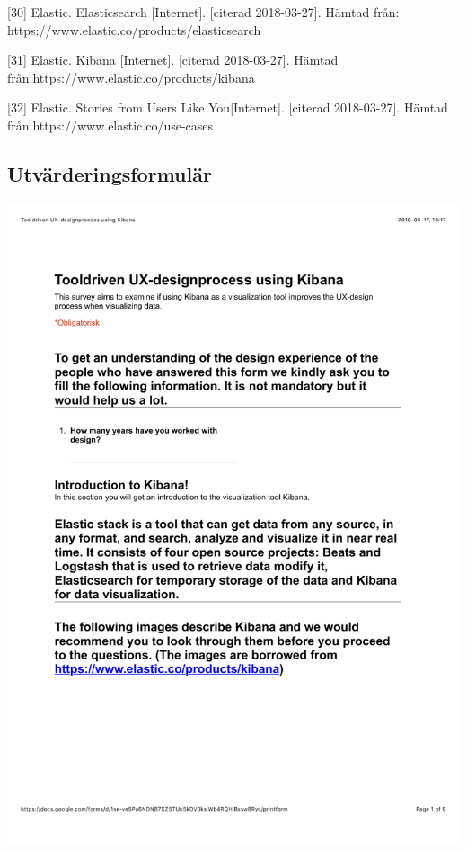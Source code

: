 \documentclass[12pt]{kththesis}
\begin{document}
[30] Elastic. Elasticsearch [Internet]. [citerad 2018-03-27]. Hämtad från: https://www.elastic.co/products/elasticsearch

[31] Elastic. Kibana [Internet]. [citerad 2018-03-27]. Hämtad från:\newline  https://www.elastic.co/products/kibana 

[32] Elastic. Stories from Users Like You[Internet]. [citerad 2018-03-27]. Hämtad från:\newline https://www.elastic.co/use-cases

\afterpage{\null\newpage}



\begin{appendices}
\renewcommand\thechapter{A}                     
\section{Utvärderingsformulär} 
\includegraphics[width=1\textwidth]{UX_designprocess1.pdf}

\end{appendices}
\end{document}
